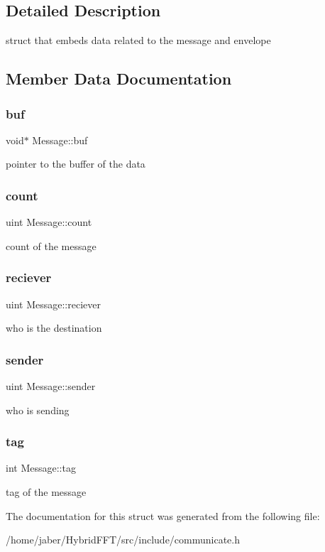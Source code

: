 \subsection{Detailed Description}
struct that embeds data related to the message and envelope 

\subsection{Member Data Documentation}
\mbox{\label{structMessage_abb937f76a19076be9c3ba4349db00707}} 
\subsubsection{\texorpdfstring{buf}{buf}}
{\footnotesize\ttfamily void$\ast$ Message\+::buf}

pointer to the buffer of the data \mbox{\label{structMessage_a66dd9a1c2793e7f4f5718b40eaa8f99a}} 
\subsubsection{\texorpdfstring{count}{count}}
{\footnotesize\ttfamily uint Message\+::count}

count of the message \mbox{\label{structMessage_a294808f8950df933fc36bf178f0b0608}} 
\subsubsection{\texorpdfstring{reciever}{reciever}}
{\footnotesize\ttfamily uint Message\+::reciever}

who is the destination \mbox{\label{structMessage_a377ce65ee6a414cb9ff14c344b34eda7}} 
\subsubsection{\texorpdfstring{sender}{sender}}
{\footnotesize\ttfamily uint Message\+::sender}

who is sending \mbox{\label{structMessage_ab84b0b508c7dd4e3852ea4f12b4afe07}} 
\subsubsection{\texorpdfstring{tag}{tag}}
{\footnotesize\ttfamily int Message\+::tag}

tag of the message 

The documentation for this struct was generated from the following file\+:\begin{DoxyCompactItemize}
\item 
/home/jaber/\+Hybrid\+F\+F\+T/src/include/communicate.\+h\end{DoxyCompactItemize}

